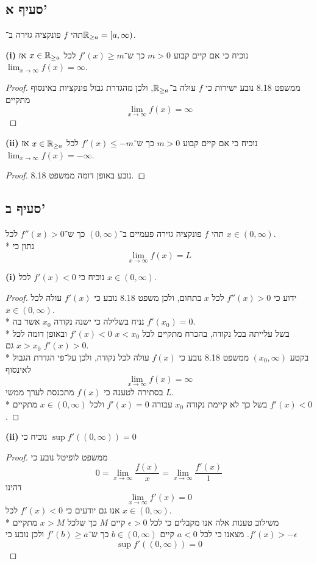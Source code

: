 \subsection{סעיף א'}
תהי $f$ פונקציה גזירה ב־$\mathbb{R}_{\ge a} = [a, \infty)$. %

\textbf{(i)}
נוכיח כי אם קיים קבוע $m > 0$ כך ש־$f'(x) \ge m$ לכל $x \in \mathbb{R}_{\ge a}$ אז $\lim_{x \to \infty} f(x) = \infty$.
\begin{proof}
	ממשפט 8.18 נובע ישירות כי $f$ עולה ב־$\mathbb{R}_{\ge a}$, ולכן מהגדרת גבול פונקציות באינסוף מתקיים
	\[
		\lim_{x \to \infty} f(x) = \infty
	\]
\end{proof}

\textbf{(ii)}
נוכיח כי אם קיים קבוע $m > 0$ כך ש־$f'(x) \le -m$ לכל $x \in \mathbb{R}_{\ge a}$ אז $\lim_{x \to \infty} f(x) = - \infty$.
\begin{proof}
	נובע באופן דומה ממשפט 8.18.
\end{proof}

\subsection{סעיף ב'}
תהי $f$ פונקציה גזירה פעמיים ב־$(0, \infty)$ כך ש־$f''(x) > 0$ לכל $x \in (0, \infty)$. \\*
נתון כי
\[
	\lim_{x \to \infty} f(x) = L
\]

\textbf{(i)}
נוכיח כי $f'(x) < 0$ לכל $x \in (0, \infty)$.
\begin{proof}
	ידוע כי $f''(x) > 0$ לכל $x$ בתחום, ולכן משפט 8.18 נובע כי $f'(x)$ עולה לכל $x \in (0, \infty)$. \\*
	נניח בשלילה כי ישנה נקודה $x_0$ אשר בה $f'(x_0) = 0$. \\*
	בשל עלייתה בכל נקודה, בהכרח מתקיים לכל $x < x_0$ $f'(x) < 0$ ובאופן דומה לכל $x > x_0$ גם $f'(x) > 0$. \\*
	בקטע $(x_0, \infty)$ ממשפט 8.18 נובע כי $f(x)$ עולה לכל נקודה, ולכן על־פי הגדרת הגבול לאינסוף
	\[
		\lim_{x \to \infty} f(x) = \infty
	\]
	בסתירה לטענה כי $f(x)$ מתכנסת לערך ממשי $L$. \\*
	בשל כך לא קיימת נקודה $x_0$ עבורה $f'(x) = 0$ ולכל $x \in (0, \infty)$ מתקיים $f'(x) < 0$.
\end{proof}

\textbf{(ii)}
נוכיח כי $\sup f'((0, \infty)) = 0$
\begin{proof}
	ממשפט לופיטל נובע כי
	\[
		0 = \lim_{x \to \infty} \frac{f(x)}{x} = \lim_{x \to \infty} \frac{f'(x)}{1}
	\]
	דהינו
	\[
		\lim_{x \to \infty} f'(x) = 0
	\]
	אנו גם יודעים כי $f'(x) < 0$ לכל $x \in (0, \infty)$. \\*
	משילוב טענות אלה אנו מקבלים כי לכל $\epsilon > 0$ קיים $M$ כך שלכל $x > M$ מתקיים $f'(x) > -\epsilon$.
	מצאנו כי לכל $a < 0$ קיים $b \in (0, \infty)$ כך ש־$f'(b) \ge a$ ולכן נובע כי
	\[
		\sup f'((0, \infty)) = 0
	\]
\end{proof}

